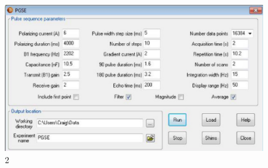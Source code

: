 \begin{figure}[H]
    \includegraphics[width = \textwidth]{2.png}
    \caption{2}
    \label{2}
    \end{figure}

